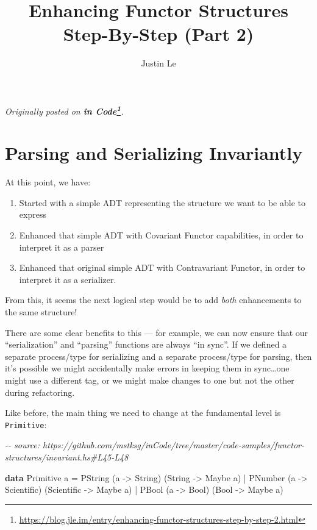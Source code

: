 \documentclass[]{article}
\title{Enhancing Functor Structures Step-By-Step (Part 2)}
\author{Justin Le}
\newenvironment{Shaded}{}{}
\newcommand{\CommentTok}[1]{\textcolor[rgb]{0.38,0.63,0.69}{\textit{#1}}}
\newcommand{\DataTypeTok}[1]{\textcolor[rgb]{0.56,0.13,0.00}{#1}}
\newcommand{\KeywordTok}[1]{\textcolor[rgb]{0.00,0.44,0.13}{\textbf{#1}}}
\newcommand{\NormalTok}[1]{#1}
\newcommand{\OperatorTok}[1]{\textcolor[rgb]{0.40,0.40,0.40}{#1}}
\newcommand{\OtherTok}[1]{\textcolor[rgb]{0.00,0.44,0.13}{#1}}
\renewcommand{\href}[2]{#2\footnote{\url{#1}}}
\begin{document}
\maketitle

\emph{Originally posted on
\textbf{\href{https://blog.jle.im/entry/enhancing-functor-structures-step-by-step-2.html}{in
Code}}.}

\hypertarget{parsing-and-serializing-invariantly}{%
\section{Parsing and Serializing
Invariantly}\label{parsing-and-serializing-invariantly}}

At this point, we have:

\begin{enumerate}
\def\labelenumi{\arabic{enumi}.}
\tightlist
\item
  Started with a simple ADT representing the structure we want to be able to
  express
\item
  Enhanced that simple ADT with Covariant Functor capabilities, in order to
  interpret it as a parser
\item
  Enhanced that original simple ADT with Contravariant Functor, in order to
  interpret it as a serializer.
\end{enumerate}

From this, it seems the next logical step would be to add \emph{both}
enhancements to the same structure!

There are some clear benefits to this --- for example, we can now ensure that
our ``serialization'' and ``parsing'' functions are always ``in sync''. If we
defined a separate process/type for serializing and a separate process/type for
parsing, then it's possible we might accidentally make errors in keeping them in
sync\ldots one might use a different tag, or we might make changes to one but
not the other during refactoring.

Like before, the main thing we need to change at the fundamental level is
\texttt{Primitive}:

\begin{Shaded}
\begin{Highlighting}[]
\CommentTok{{-}{-} source: https://github.com/mstksg/inCode/tree/master/code{-}samples/functor{-}structures/invariant.hs\#L45{-}L48}

\KeywordTok{data} \DataTypeTok{Primitive}\NormalTok{ a }\OtherTok{=}
      \DataTypeTok{PString}\NormalTok{ (a }\OtherTok{{-}>} \DataTypeTok{String}\NormalTok{)     (}\DataTypeTok{String}     \OtherTok{{-}>} \DataTypeTok{Maybe}\NormalTok{ a)}
    \OperatorTok{|} \DataTypeTok{PNumber}\NormalTok{ (a }\OtherTok{{-}>} \DataTypeTok{Scientific}\NormalTok{) (}\DataTypeTok{Scientific} \OtherTok{{-}>} \DataTypeTok{Maybe}\NormalTok{ a)}
    \OperatorTok{|} \DataTypeTok{PBool}\NormalTok{   (a }\OtherTok{{-}>} \DataTypeTok{Bool}\NormalTok{)       (}\DataTypeTok{Bool}       \OtherTok{{-}>} \DataTypeTok{Maybe}\NormalTok{ a)}
\end{Highlighting}
\end{Shaded}
\end{document}
